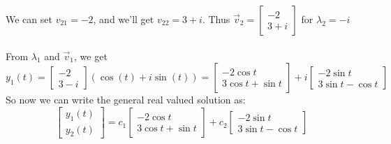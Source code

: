 \documentclass[12pt]{article}
\begin{document}
We can set $v_{21} = -2$, and we'll get $v_{22} = 3+i$. Thus $\vec{v}_2 = \begin{bmatrix} -2 \\ 3+i	\end{bmatrix}$ for $\lambda_2 = -i$
\\ \\ 
From $\lambda_1$ and $\vec{v}_1$, we get 
$$
y_1(t) = 
\begin{bmatrix}
-2 \\ 3-i
\end{bmatrix} \left(\cos(t) + i\sin(t)\right) = 
\begin{bmatrix}
-2\cos t \\
3\cos t + \sin t
\end{bmatrix} +
i \begin{bmatrix}
-2\sin t \\
3\sin t - \cos t
\end{bmatrix}
$$
So now we can write the general real valued solution as:
$$
\begin{bmatrix} y_1(t) \\ y_2(t) \end{bmatrix} =
c_1\begin{bmatrix}
-2\cos t \\
3\cos t + \sin t
\end{bmatrix} +
c_2 \begin{bmatrix}
-2\sin t \\
3\sin t - \cos t
\end{bmatrix}
$$
\end{document}
